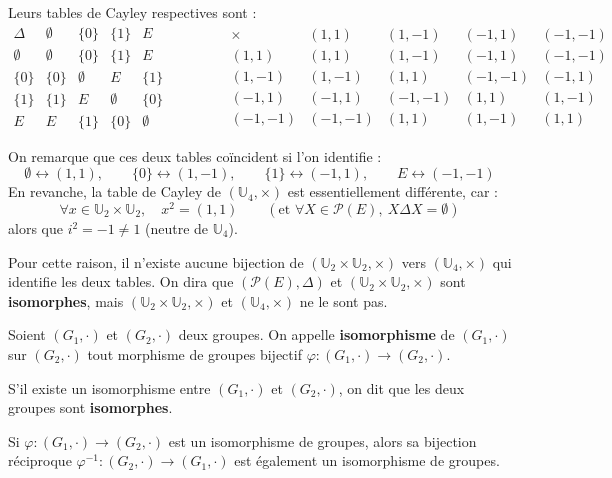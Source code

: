 \documentclass[a4paper,11pt]{article}
\newcommand{\U}{\mathbb{U}}
\newcommand{\mot}[1]{\textcolor{bordeaux}{\textbf{#1}}}
\begin{document}
Leurs tables de Cayley respectives sont :
\[
\begin{array}{c|cccc}
\Delta & \emptyset & \{0\} & \{1\} & E \\
\hline
\emptyset & \emptyset & \{0\} & \{1\} & E \\
\{0\} & \{0\} & \emptyset & E & \{1\} \\
\{1\} & \{1\} & E & \emptyset & \{0\} \\
E & E & \{1\} & \{0\} & \emptyset
\end{array}
\qquad \qquad
\begin{array}{c|cccc}
\times & (1, 1) & (1, -1) & (-1, 1) & (-1, -1) \\
\hline
(1, 1) & (1, 1) & (1, -1) & (-1, 1) & (-1, -1) \\
(1, -1) & (1, -1) & (1, 1) & (-1, -1) & (-1, 1) \\
(-1, 1) & (-1, 1) & (-1, -1) & (1, 1) & (1, -1) \\
(-1, -1) & (-1, -1) & (1, 1) & (1, -1) & (1, 1)
\end{array}
\]

On remarque que ces deux tables coïncident si l'on identifie :
\[
\emptyset \longleftrightarrow (1, 1), \qquad \{0\} \longleftrightarrow (1, -1), \qquad \{1\} \longleftrightarrow (-1, 1), \qquad E \longleftrightarrow (-1, -1)
\]
En revanche, la table de Cayley de $(\U_4, \times)$ est essentiellement différente, car :
\[
\forall x \in \U_2 \times \U_2, \quad x^2 = (1, 1) \qquad (\text{et } \forall X \in \mathcal{P}(E), \ X \Delta X = \emptyset)
\]
alors que $i^2 = -1 \neq 1$ (neutre de $\U_4$).

Pour cette raison, il n'existe aucune bijection de $(\U_2 \times \U_2, \times)$ vers $(\U_4, \times)$ qui identifie les deux tables. On dira que $(\mathcal{P}(E), \Delta)$ et $(\U_2 \times \U_2, \times)$ sont \mot{isomorphes}, mais $(\U_2 \times \U_2, \times)$ et $(\U_4, \times)$ ne le sont pas.

\begin{definition}
Soient $(G_1, \cdot)$ et $(G_2, \cdot)$ deux groupes. On appelle \mot{isomorphisme} de $(G_1, \cdot)$ sur $(G_2, \cdot)$ tout morphisme de groupes bijectif $\varphi : (G_1, \cdot) \to (G_2, \cdot)$.

S'il existe un isomorphisme entre $(G_1, \cdot)$ et $(G_2, \cdot)$, on dit que les deux groupes sont \mot{isomorphes}.
\end{definition}

\begin{proposition}
Si $\varphi : (G_1, \cdot) \to (G_2, \cdot)$ est un isomorphisme de groupes, alors sa bijection réciproque $\varphi^{-1} : (G_2, \cdot) \to (G_1, \cdot)$ est également un isomorphisme de groupes.
\end{proposition}
\end{document}
